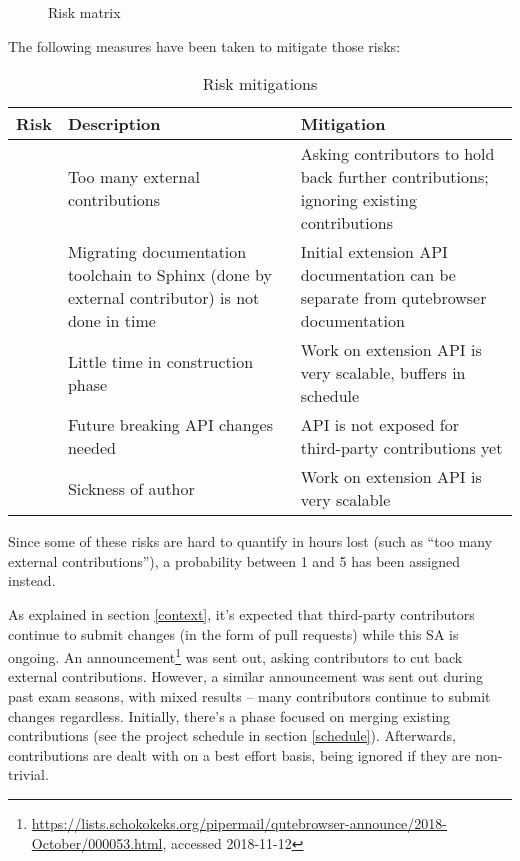 \begin{figure}[H]
  \caption{Risk matrix}
  \label{img:risiko}
\end{figure}

The following measures have been taken to mitigate those risks:

\begin{table}[H]
  \begin{tabulary}{\linewidth}{lLL}
    \toprule
    Risk & Description & Mitigation \\
    \midrule
     & Too many external contributions & Asking contributors to hold back further contributions; ignoring existing contributions  \\
    \hline
     & Migrating documentation toolchain to Sphinx (done by external contributor)
    is not done in time & Initial extension API documentation can be separate from
    qutebrowser documentation \\
    \hline
     & Little time in construction phase & Work on extension API is very
    scalable, buffers in schedule \\
    \hline
     & Future breaking API changes needed & API is not exposed for third-party
    contributions yet \\
    \hline
     & Sickness of author & Work on extension API is very scalable \\
    \bottomrule
  \end{tabulary}
  \caption{Risk mitigations}
\end{table}

Since some of these risks are hard to quantify in hours lost (such as ``too many
external contributions''), a probability between 1 and 5 has been assigned instead.

As explained in section \ref{context}, it's expected that third-party
contributors continue to submit changes (in the form of pull requests) while
this SA is ongoing. An
announcement\footnote{\url{https://lists.schokokeks.org/pipermail/qutebrowser-announce/2018-October/000053.html},
  accessed 2018-11-12} was sent out, asking contributors to cut back external
contributions. However, a similar announcement was sent out during past exam
seasons, with mixed results -- many contributors continue to submit changes
regardless. Initially, there's a phase focused on merging existing
contributions (see the project schedule in section \ref{schedule}). Afterwards,
contributions are dealt with on a best effort basis, being ignored if they
are non-trivial.

